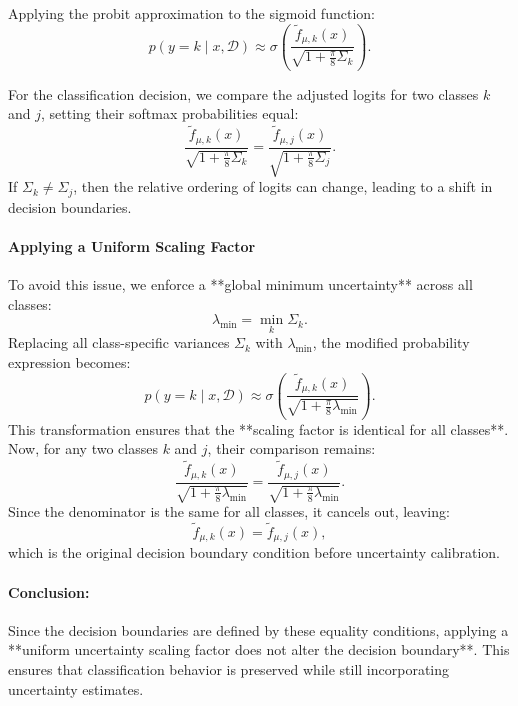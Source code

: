 \documentclass{article}
\begin{document}
Applying the probit approximation to the sigmoid function:
\begin{equation}
    p(y = k \mid x, \mathcal{D}) \approx \sigma\!\left( \frac{\tilde{f}_{\mu,k}(x)}{\sqrt{1+\frac{\pi}{8} \Sigma_k}} \right).
\end{equation}

For the classification decision, we compare the adjusted logits for two classes \( k \) and \( j \), setting their softmax probabilities equal:
\begin{equation}
    \frac{\tilde{f}_{\mu,k}(x)}{\sqrt{1+\frac{\pi}{8} \Sigma_k}} = \frac{\tilde{f}_{\mu,j}(x)}{\sqrt{1+\frac{\pi}{8} \Sigma_j}}.
\end{equation}
If \( \Sigma_k \neq \Sigma_j \), then the relative ordering of logits can change, leading to a shift in decision boundaries.

\paragraph{Applying a Uniform Scaling Factor}
To avoid this issue, we enforce a **global minimum uncertainty** across all classes:
\begin{equation}
    \lambda_{\min} = \min_{k} \Sigma_k.
\end{equation}
Replacing all class-specific variances \( \Sigma_k \) with \( \lambda_{\min} \), the modified probability expression becomes:
\begin{equation}
    p(y = k \mid x, \mathcal{D}) \approx \sigma\!\left( \frac{\tilde{f}_{\mu,k}(x)}{\sqrt{1+\frac{\pi}{8} \lambda_{\min}}} \right).
\end{equation}
This transformation ensures that the **scaling factor is identical for all classes**. Now, for any two classes \( k \) and \( j \), their comparison remains:
\begin{equation}
    \frac{\tilde{f}_{\mu,k}(x)}{\sqrt{1+\frac{\pi}{8} \lambda_{\min}}} = \frac{\tilde{f}_{\mu,j}(x)}{\sqrt{1+\frac{\pi}{8} \lambda_{\min}}}.
\end{equation}
Since the denominator is the same for all classes, it cancels out, leaving:
\begin{equation}
    \tilde{f}_{\mu,k}(x) = \tilde{f}_{\mu,j}(x),
\end{equation}
which is the original decision boundary condition before uncertainty calibration.

\paragraph{Conclusion:}
Since the decision boundaries are defined by these equality conditions, applying a **uniform uncertainty scaling factor does not alter the decision boundary**. This ensures that classification behavior is preserved while still incorporating uncertainty estimates.
\end{document}
